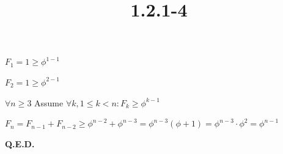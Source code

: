 \documentclass{article}
\title{1.2.1-4}
\begin{document}
\maketitle

$F_1 = 1 \geq \phi^{1-1}$

$F_2 = 1 \geq \phi^{2-1}$

$\forall n \geq 3$ Assume $\forall k, 1 \leq k < n: F_k \geq \phi^{k-1}$

$F_{n} = F_{n-1} + F_{n-2} \geq \phi^{n-2} + \phi^{n-3} = \phi^{n-3}(\phi + 1) = \phi^{n-3} \cdot \phi^2 = \phi^{n-1}$

\textbf{Q.E.D.}
\end{document}
